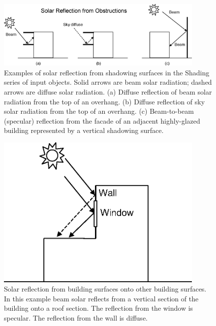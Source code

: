 \begin{figure}[hbtp] %
\centering
\includegraphics[width=0.9\textwidth, height=0.9\textheight, keepaspectratio=true]{media/image670.png}
\caption{Examples of solar reflection from shadowing surfaces in the Shading series of input objects. Solid arrows are beam solar radiation; dashed arrows are diffuse solar radiation. (a) Diffuse reflection of beam solar radiation from the top of an overhang. (b) Diffuse reflection of sky solar radiation from the top of an overhang. (c) Beam-to-beam (specular) reflection from the facade of an adjacent highly-glazed building represented by a vertical shadowing surface. \protect \label{fig:examples-of-solar-reflection-from-shadowing}}
\end{figure}

\begin{figure}[hbtp] %
\centering
\includegraphics[width=0.9\textwidth, height=0.9\textheight, keepaspectratio=true]{media/image671.png}
\caption{Solar reflection from building surfaces onto other building surfaces. In this example beam solar reflects from a vertical section of the building onto a roof section. The reflection from the window is specular. The reflection from the wall is diffuse. \protect \label{fig:solar-reflection-from-building-surfaces-onto}}
\end{figure}

